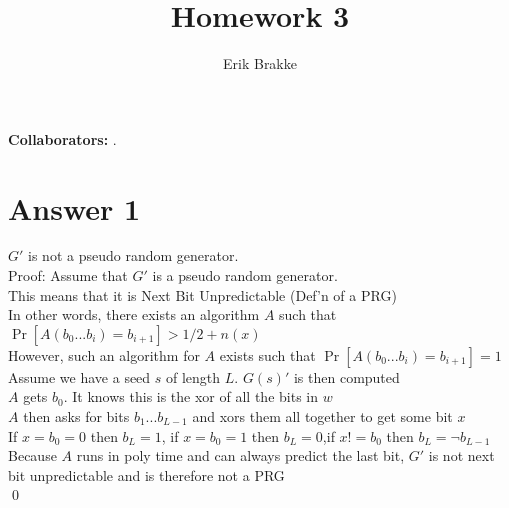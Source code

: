 \documentclass[11pt]{article}
\providecommand{\myparab}[1]{\smallskip\noindent\textbf{#1} }
\theoremstyle{definition}
\begin{document}
\title{Homework 3}
\author{Erik Brakke}
\maketitle

\thispagestyle{fancy}

\myparab{Collaborators: }  .
 
 
\section*{Answer 1}
$G'$ is not a pseudo random generator.\\
Proof: Assume that $G'$ is a pseudo random generator.\\
This means that it is Next Bit Unpredictable (Def'n of a PRG)\\
In other words, there exists an algorithm $A$ such that $\Pr[A(b_0...b_i) = b_{i+1}] > 1/2 + n(x)$\\
However, such an algorithm for $A$ exists such that $\Pr[A(b_0...b_i) = b_{i+1}] = 1$\\
Assume we have a seed $s$ of length $L$.  $G(s)'$ is then computed\\
$A$ gets $b_0$.  It knows this is the xor of all the bits in $w$\\
$A$ then asks for bits $b_1...b_{L-1}$ and xors them all together to get some bit $x$\\
If $x = b_0 = 0$ then $b_L = 1$, if $x = b_0 = 1$ then $b_L = 0$,if $x != b_0$ then $b_L = \neg b_{L-1}$\\
Because $A$ runs in poly time and can always predict the last bit, $G'$ is not next bit unpredictable and is therefore not a PRG\\
\qed
\end{document}
